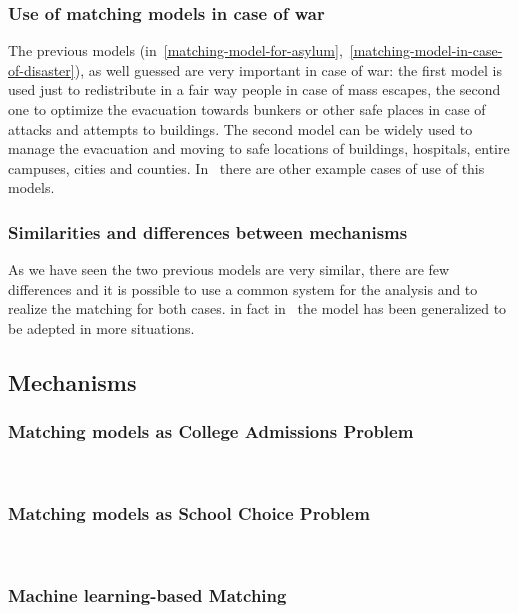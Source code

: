 \documentclass[letterpaper]{article} %
\begin{document}
    \subsubsection{Use of matching models in case of war}\label{use-of-matching-model-in-case-of-war}%
    The previous models (in~\ref{matching-model-for-asylum},~\ref{matching-model-in-case-of-disaster}), as well guessed
    are very important in case of war: the first model is used just
    to redistribute in a fair way people in case of mass escapes, the second one to optimize the evacuation
    towards bunkers or other safe places in case of attacks and attempts to buildings.
    The second model can be widely used to manage the evacuation and moving to safe locations of buildings, hospitals,
    entire campuses, cities and counties.
    In~\citet{delacretaz_2020,delacretaz_2019,delacretaz_2016}   there are other example cases of use of this models.

    \subsubsection{Similarities and differences between mechanisms}\label{similarities-and-differences-between-mechanisms}

    As we have seen the two previous models are very similar, there are few differences and it is possible to use a
    common system for the analysis and to realize the matching for both cases.
    in fact in~\citet{delacretaz_2020} the model has been generalized to be adepted in more situations.

    \subsection{Mechanisms}

    \subsubsection{Matching models as College Admissions Problem}\label{matching-model-as-college-admissions-problem}~\citet{basshuysen}

    \subsubsection{Matching models as School Choice Problem}\label{matching-model-as-school-choice-problem}~\citet{basshuysen}

    \subsubsection{Machine learning-based Matching}\label{machine-learning-based-matching}~\citet{olbergml}
\end{document}

